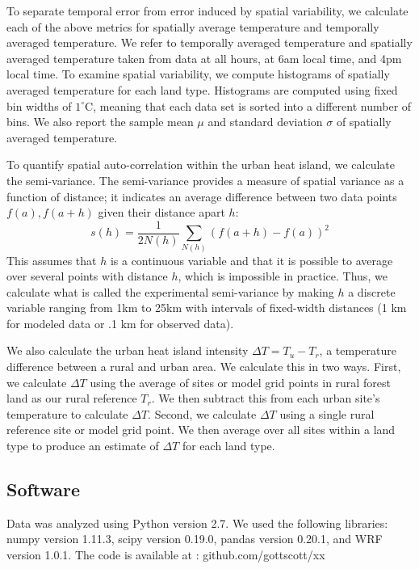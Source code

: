 \documentclass[draft,linenumbers]{agujournal}
\begin{document}
To separate temporal error from error induced by spatial variability, we calculate each of the above metrics for spatially average temperature and temporally averaged temperature. We refer to temporally averaged temperature  and spatially averaged temperature taken from data at all hours, at 6am local time, and 4pm local time. 
To examine spatial variability, we compute histograms of spatially averaged temperature for each land type. Histograms are computed using fixed bin widths of $1^\circ$C, meaning that each data set is sorted into a different number of bins. We also report the sample mean $\mu$ and standard deviation $\sigma$ of spatially averaged temperature. 

To quantify spatial auto-correlation within the urban heat island, we calculate the semi-variance. The semi-variance provides a measure of spatial variance as a function of distance; it indicates an average difference between two data points $f(a), f(a+h)$ given their distance apart $h$: 
\begin{equation}
 s(h) = \frac{1}{2 N(h)} \sum _{N(h)} \left(f(a+h) -f(a)\right)^2
\label{eq:semivariogram}
\end{equation}
This assumes that $h$ is a continuous variable and that it is possible to average over several points with distance $h$, which is impossible in practice. Thus, we calculate what is called the experimental semi-variance by making $h$ a discrete variable ranging from 1km to 25km with intervals of fixed-width distances (1 km for modeled data or .1 km for observed data). 

We also calculate the urban heat island intensity $\Delta T = T_u - T_r$, a temperature difference between a rural and urban area. We calculate this in two ways. First, we calculate $\Delta T$ using the average of sites or model grid points in rural forest land as our rural reference $T_r$. We then subtract this from each urban site's temperature to calculate $\Delta T$. 
Second, we calculate $\Delta T$ using a single rural reference site or model grid point. We then average over all sites within a land type to produce an estimate of $\Delta T$ for each land type. 

\subsection{Software}
Data was analyzed using Python version 2.7. We used the following libraries: numpy version 1.11.3, scipy version 0.19.0, pandas version 0.20.1, and WRF version 1.0.1. 
The code is available at :  github.com/gottscott/xx
\end{document}

